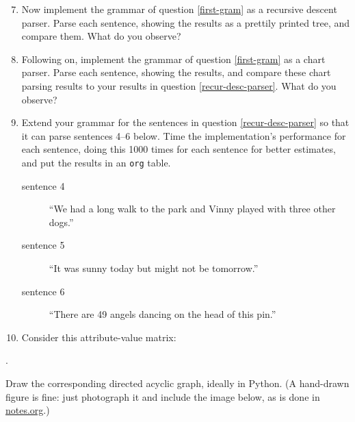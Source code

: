 \documentclass[11pt]{article}
\begin{document}
\begin{enumerate}
\setcounter{enumi}{6}
\item \label{recur-desc-parser} Now implement the grammar of question
\ref{first-gram} as a recursive descent parser.  Parse each sentence, showing
the results as a prettily printed tree, and compare them.  What do you
observe?

\item \label{chart-parser} Following on, implement the grammar of question
\ref{first-gram} as a chart parser.  Parse each sentence, showing the results,
and compare these chart parsing results to your results in question
\ref{recur-desc-parser}.  What do you observe?

\item \label{clock} Extend your grammar for the sentences in question
\ref{recur-desc-parser}  so that it can parse sentences 4--6 below.  Time the
implementation's performance for each sentence, doing this 1000 times
for each sentence for better estimates, and put the results  in an \texttt{org} table.
\begin{description}
\item[{sentence 4}] ``We had a long walk to the park and Vinny played with
three other dogs.''
\item[{sentence 5}] ``It was sunny today but might not be tomorrow.''
\item[{sentence 6}] ``There are 49 angels dancing on the head of this pin.''
\end{description}

\item \label{avm-graph} Consider this attribute-value matrix:
\end{enumerate}

\begin{center}
.
\end{center}

Draw the corresponding directed acyclic graph, ideally in Python.  (A hand-drawn figure is fine:
just photograph it and include the image below, as is done in \href{../notes.org}{notes.org}.)
\end{document}
